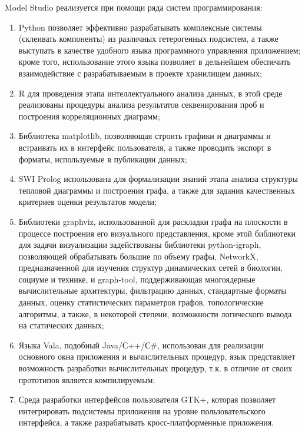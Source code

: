 \documentclass[a4paper,12pt,openany,final]{extreport}
\begin{document}
Model Studio реализуется при помощи ряда систем программирования:

\begin{enumerate}
\def\labelenumi{\arabic{enumi}.}
\item
  Python позволяет эффективно разрабатывать комплексные системы
  (склеивать компоненты) из различных гетерогенных подсистем, а также
  выступать в качестве удобного языка программного управления
  приложением; кроме того, использование этого языка позволяет в
  дельнейшем обеспечить взаимодействие с разрабатываемым в проекте
  хранилищем данных;
\item
  R для проведения этапа интеллектуального анализа данных, в этой среде
  реализованы процедуры анализа результатов секвенирования проб и
  построения корреляционных диаграмм;
\item
  Библиотека matplotlib, позволяющая строить графики и диаграммы и
  встраивать их в интерфейс пользователя, а также проводить экспорт в
  форматы, используемые в публикации данных;
\item
  SWI Prolog использована для формализации знаний этапа анализа
  структуры тепловой диаграммы и построения графа, а также для задания
  качественных критериев оценки результатов модели;
\item
  Библиотеки graphviz, использованной для раскладки графа на плоскости в
  процессе построения его визуального представления, кроме этой
  библиотеки для задачи визуализации задействованы библиотеки
  python-igraph, позволяющей обрабатывать большие по объему графы,
  NetworkX, предназначенной для изучения структур динамических сетей в
  биологии, социуме и технике, и graph-tool, поддерживающая многоядерные
  вычислительные архитектуры, фильтрацию данных, стандартные форматы
  данных, оценку статистических параметров графов, топологические
  алгоритмы, а также, в некоторой степени, возможности логического
  вывода на статических данных;
\item
  Языка Vala, подобный Java/С++/С\#, использован для реализации
  основного окна приложения и вычислительных процедур, язык представляет
  возможность разработки вычислительных процедур, т.к. в отличие от
  своих прототипов является компилируемым;
\item
  Среда разработки интерфейсов пользователя GTK+, которая позволяет
  интегрировать подсистемы приложения на уровне пользовательского
  интерфейса, а также разрабатывать кросс-платформенные приложения.
\end{enumerate}
\end{document}
